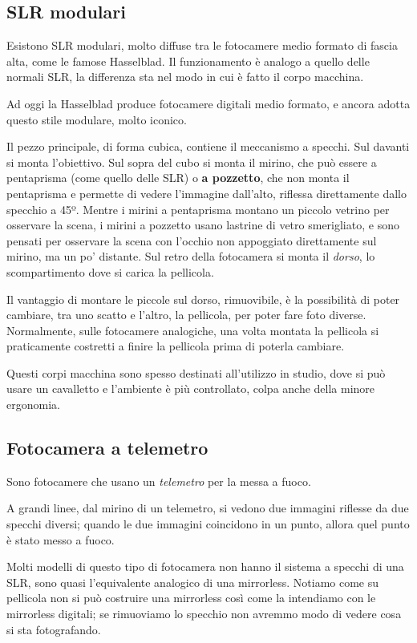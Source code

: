 \subsection{SLR modulari} \label{subsec:slrmodulari}
Esistono SLR modulari, molto diffuse tra le fotocamere medio formato di fascia alta, come le famose Hasselblad.
Il funzionamento è analogo a quello delle normali SLR, la differenza sta nel modo in cui è fatto il corpo macchina.

Ad oggi la Hasselblad produce fotocamere digitali medio formato, e ancora adotta questo stile modulare, molto iconico.

Il pezzo principale, di forma cubica, contiene il meccanismo a specchi. Sul davanti si monta l'obiettivo. Sul sopra del cubo si monta il mirino, che può essere a pentaprisma (come quello delle SLR) o \textbf{a pozzetto}, che non monta il pentaprisma e permette di vedere l'immagine dall'alto, riflessa direttamente dallo specchio a 45º. Mentre i mirini a pentaprisma montano un piccolo vetrino per osservare la scena, i mirini a pozzetto usano lastrine di vetro smerigliato, e sono pensati per osservare la scena con l'occhio non appoggiato direttamente sul mirino, ma un po' distante.
Sul retro della fotocamera si monta il \textit{dorso}, lo scompartimento dove si carica la pellicola.

Il vantaggio di montare le piccole sul dorso, rimuovibile, è la possibilità di poter cambiare, tra uno scatto e l'altro, la pellicola, per poter fare foto diverse.
Normalmente, sulle fotocamere analogiche, una volta montata la pellicola si praticamente costretti a finire la pellicola prima di poterla cambiare.

Questi corpi macchina sono spesso destinati all'utilizzo in studio, dove si può usare un cavalletto e l'ambiente è più controllato, colpa anche della minore ergonomia.


\subsection{Fotocamera a telemetro} \label{subsec:telemetro}
Sono fotocamere che usano un \textit{telemetro} per la messa a fuoco.

A grandi linee, dal mirino di un telemetro, si vedono due immagini riflesse da due specchi diversi; quando le due immagini coincidono in un punto, allora quel punto è stato messo a fuoco.

Molti modelli di questo tipo di fotocamera non hanno il sistema a specchi di una SLR, sono quasi l'equivalente analogico di una mirrorless.
Notiamo come su pellicola non si può costruire una mirrorless così come la intendiamo con le mirrorless digitali; se rimuoviamo lo specchio non avremmo modo di vedere cosa si sta fotografando.

